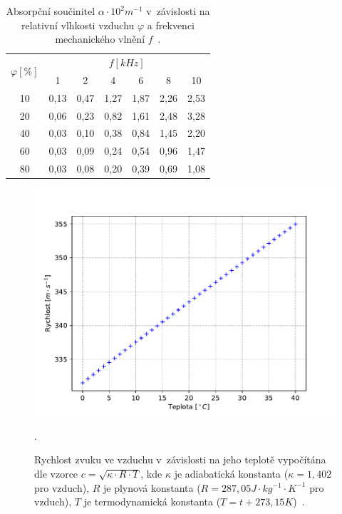             \begin{table}[h]\centering
                \begin{tabular}{@{}ccccccc@{}}
                    \toprule
                    \multirow{2}{*}{$\varphi\unit{[\%]}$}& \multicolumn{6}{c}{$f\unit{[kHz]}$}\\
                    \cmidrule{2-7}
                        &   1       &   2       &   4       &   6       &   8       &   10      \\
                    \midrule
                    10  &   0,13    &   0,47    &   1,27    &   1,87    &   2,26    &   2,53    \\
                    20  &   0,06    &   0,23    &   0,82    &   1,61    &   2,48    &   3,28    \\
                    40  &   0,03    &   0,10    &   0,38    &   0,84    &   1,45    &   2,20    \\
                    60  &   0,03    &   0,09    &   0,24    &   0,54    &   0,96    &   1,47    \\
                    80  &   0,03    &   0,08    &   0,20    &   0,39    &   0,69    &   1,08    \\

                    \bottomrule
                \end{tabular}
                \caption{Absorpční součinitel $\alpha \cdot 10^2\unit{m^{-1}}$ v~závislosti na relativní vlhkosti vzduchu $\varphi$ a frekvenci mechanického vlnění $f$~\cite{tables}.}
                \label{table:gas}
            \end{table}

            \begin{figure}[H]
                \centering
                \includegraphics[width=\linewidth]{obrazky-figures/sound_speed.pdf}
                \caption{Rychlost zvuku ve vzduchu v~závislosti na jeho teplotě vypočítána dle vzorce $c = \sqrt{\kappa\cdot R\cdot T}$, kde $\kappa$ je adiabatická konstanta ($\kappa = 1,402$ pro vzduch), $R$ je plynová konstanta ($R=287,05\unit{J\cdot kg^{-1}\cdot K^{-1}}$ pro vzduch), $T$ je termodynamická konstanta ($T= t + 273,15\unit{K}$)~\cite{dado}.}.
                \label{img:us_speed}
            \end{figure}


